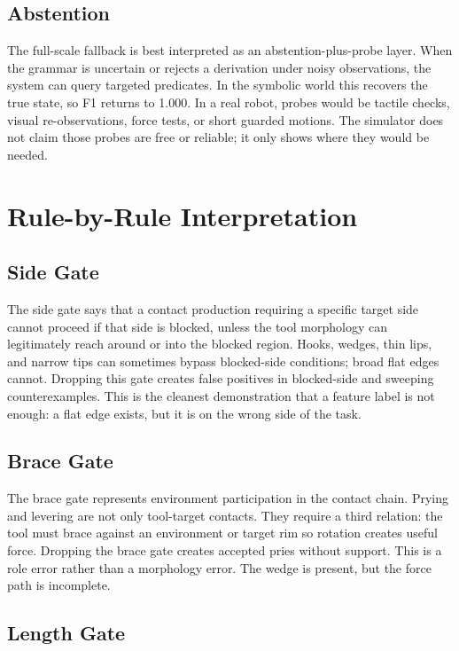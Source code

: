 \documentclass{article}
\begin{document}
\subsection{Abstention}

The full-scale fallback is best interpreted as an abstention-plus-probe layer. When the grammar is uncertain or rejects a derivation under noisy observations, the system can query targeted predicates. In the symbolic world this recovers the true state, so F1 returns to 1.000. In a real robot, probes would be tactile checks, visual re-observations, force tests, or short guarded motions. The simulator does not claim those probes are free or reliable; it only shows where they would be needed.

\section{Rule-by-Rule Interpretation}

\subsection{Side Gate}

The side gate says that a contact production requiring a specific target side cannot proceed if that side is blocked, unless the tool morphology can legitimately reach around or into the blocked region. Hooks, wedges, thin lips, and narrow tips can sometimes bypass blocked-side conditions; broad flat edges cannot. Dropping this gate creates false positives in blocked-side and sweeping counterexamples. This is the cleanest demonstration that a feature label is not enough: a flat edge exists, but it is on the wrong side of the task.

\subsection{Brace Gate}

The brace gate represents environment participation in the contact chain. Prying and levering are not only tool-target contacts. They require a third relation: the tool must brace against an environment or target rim so rotation creates useful force. Dropping the brace gate creates accepted pries without support. This is a role error rather than a morphology error. The wedge is present, but the force path is incomplete.

\subsection{Length Gate}
\end{document}

